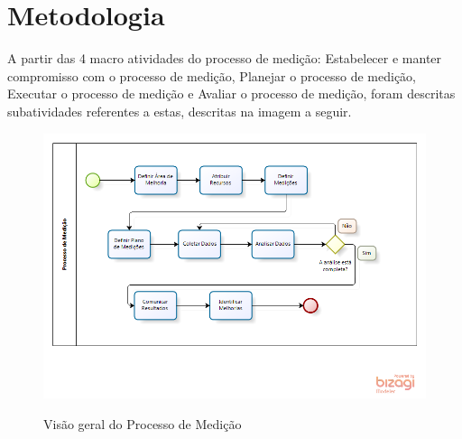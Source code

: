 \chapter{Metodologia}

A partir das 4 macro atividades do processo de medição: Estabelecer e manter compromisso com o processo de medição, Planejar o processo de medição, Executar o processo de medição e Avaliar o processo de medição, foram descritas subatividades referentes a estas, descritas na imagem a seguir.

\begin{figure}[!htp]
		\centering
		\includegraphics[scale=0.75]{figuras/medicao}
		\label{img:processo}
		\caption{Visão geral do Processo de Medição}
\end{figure}
